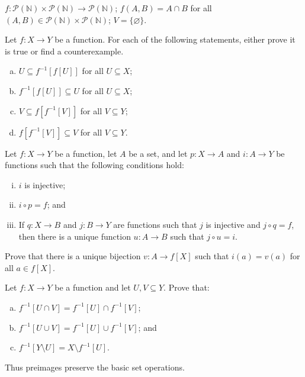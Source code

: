 \begin{chapex}
\label{cqComputePreimageEnd}
$f : \mathcal{P}(\mathbb{N}) \times \mathcal{P}(\mathbb{N}) \to \mathcal{P}(\mathbb{N})$; $f(A,B) = A \cap B$ for all $(A,B) \in \mathcal{P}(\mathbb{N}) \times \mathcal{P}(\mathbb{N})$; $V = \{ \varnothing \}$.
\end{chapex}

\begin{chapex}
Let $f : X \to Y$ be a function. For each of the following statements, either prove it is true or find a counterexample.
\begin{multicols}{2}
\begin{enumerate}[(a)]
\item $U \subseteq f^{-1}[f[U]]$ for all $U \subseteq X$;
\item $f^{-1}[f[U]] \subseteq U$ for all $U \subseteq X$;
\item $V \subseteq f[f^{-1}[V]]$ for all $V \subseteq Y$;
\item $f[f^{-1}[V]] \subseteq V$ for all $V \subseteq Y$.
\end{enumerate}
\end{multicols}
\end{chapex}

\begin{chapex}
Let $f : X \to Y$ be a function, let $A$ be a set, and let $p : X \to A$ and $i : A \to Y$ be functions such that the following conditions hold:
\begin{enumerate}[(i)]
\item $i$ is injective;
\item $i \circ p = f$; and
\item If $q : X \to B$ and $j : B \to Y$ are functions such that $j$ is injective and $j \circ q = f$, then there is a unique function $u : A \to B$ such that $j \circ u = i$.
\end{enumerate}
Prove that there is a unique bijection $v : A \to f[X]$ such that $i(a)=v(a)$ for all $a \in f[X]$.
\end{chapex}

\begin{chapex}
Let $f : X \to Y$ be a function and let $U, V \subseteq Y$. Prove that:
\begin{enumerate}[(a)]
\item $f^{-1}[U \cap V] = f^{-1}[U] \cap f^{-1}[V]$;
\item $f^{-1}[U \cup V] = f^{-1}[U] \cup f^{-1}[V]$; and
\item $f^{-1}[Y \setminus U] = X \setminus f^{-1}[U]$.
\end{enumerate}
Thus preimages preserve the basic set operations.
\end{chapex}

